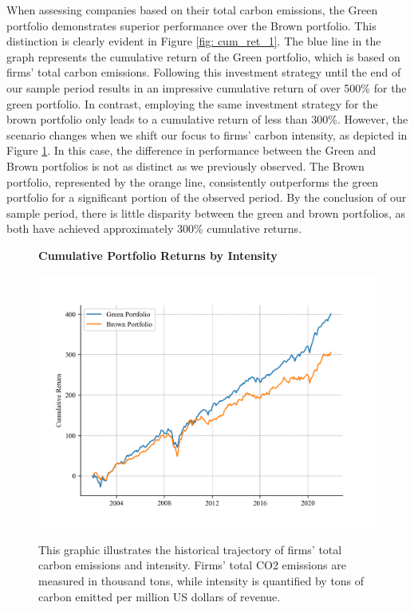 \documentclass[12pt]{article}
\begin{document}
When assessing companies based on their total carbon emissions, the Green portfolio demonstrates superior performance over the Brown portfolio. This distinction is clearly evident in Figure \ref{fig: cum_ret_1}. The blue line in the graph represents the cumulative return of the Green portfolio, which is based on firms' total carbon emissions. Following this investment strategy until the end of our sample period results in an impressive cumulative return of over 500\% for the green portfolio. In contrast, employing the same investment strategy for the brown portfolio only leads to a cumulative return of less than 300\%. However, the scenario changes when we shift our focus to firms' carbon intensity, as depicted in Figure \ref{fig: cum_ret_2}. In this case, the difference in performance between the Green and Brown portfolios is not as distinct as we previously observed. The Brown portfolio, represented by the orange line, consistently outperforms the green portfolio for a significant portion of the observed period. By the conclusion of our sample period, there is little disparity between the green and brown portfolios, as both have achieved approximately 300\% cumulative returns.

\begin{figure}[!ht]
\centering
\caption{\textbf{Cumulative Portfolio Returns by Intensity}}
\includegraphics{graphics/green_brown_int.png}
\label{fig: cum_ret_2}
\caption*{\footnotesize{This graphic illustrates the historical trajectory of firms' total carbon emissions and intensity. Firms' total CO2 emissions are measured in thousand tons, while intensity is quantified by tons of carbon emitted per million US dollars of revenue.}}
\end{figure}
\end{document}
